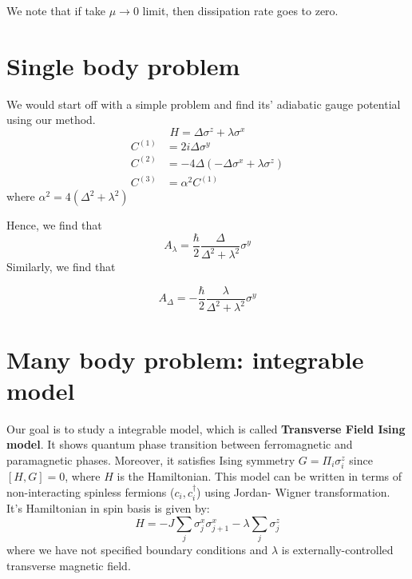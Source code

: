 \documentclass[11pt,a4paper]{article}
\begin{document}
We note that if take $\mu \rightarrow 0$ limit, then dissipation rate goes to zero.



\section{Single body problem}
We would start off with a simple problem and find its' adiabatic gauge potential using our method.
\begin{equation}
H= \Delta \sigma^z + \lambda \sigma^x
\end{equation}
\begin{align}
C^{(1)} &= 2 i \Delta \sigma^y \\
C^{(2)} &= - 4  \Delta ( -  \Delta \sigma^x + \lambda \sigma^z) \\
C^{(3)} &= \alpha^2 C^{(1)} 
\end{align}
where $\alpha^2 = 4 (\Delta^2 + \lambda^2) $

Hence, we find that 
\begin{equation}
A_{\lambda}= \dfrac{\hbar}{2}\dfrac{\Delta }{\Delta^2 + \lambda^2} \sigma^y
\end{equation}
Similarly, we find that 

\begin{equation}
A_{\Delta}= -\dfrac{\hbar}{2}\dfrac{\lambda }{\Delta^2 + \lambda^2} \sigma^y
\end{equation}
\section{Many body problem: integrable model}
Our goal is to study a integrable model, which is called \textbf{Transverse Field Ising model}. It shows quantum phase transition between ferromagnetic and paramagnetic phases. Moreover, it satisfies Ising symmetry $G= \Pi_i \sigma_i^z$ since $[H, G]=0$, where $H$ is the Hamiltonian.
This model can be written in terms of non-interacting spinless fermions ($c_i, c^{\dagger}_i $) using Jordan- Wigner transformation. It's Hamiltonian in spin basis is given by:
\begin{equation}
H= -J \sum_{j} \sigma_j^x \sigma_{j+1}^x - \lambda \sum_{j} \sigma_j^z 
\label{xx_z}
\end{equation}
where we have not specified boundary conditions and $\lambda$ is externally-controlled transverse magnetic field.
\end{document}
